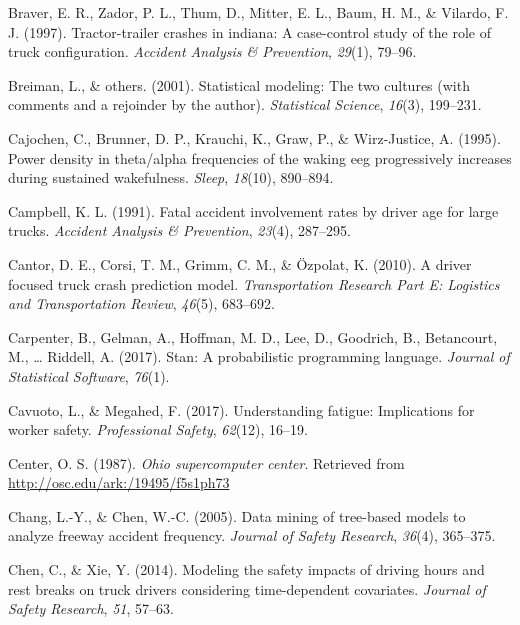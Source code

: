 \documentclass[12pt]{book}
\numberwithin{equation}{chapter}
\begin{document}
\leavevmode\hypertarget{ref-braver1997tractor}{}%
Braver, E. R., Zador, P. L., Thum, D., Mitter, E. L., Baum, H. M., \& Vilardo, F. J. (1997). Tractor-trailer crashes in indiana: A case-control study of the role of truck configuration. \emph{Accident Analysis \& Prevention}, \emph{29}(1), 79--96.

\leavevmode\hypertarget{ref-breiman2001statistical}{}%
Breiman, L., \& others. (2001). Statistical modeling: The two cultures (with comments and a rejoinder by the author). \emph{Statistical Science}, \emph{16}(3), 199--231.

\leavevmode\hypertarget{ref-cajochen1995power}{}%
Cajochen, C., Brunner, D. P., Krauchi, K., Graw, P., \& Wirz-Justice, A. (1995). Power density in theta/alpha frequencies of the waking eeg progressively increases during sustained wakefulness. \emph{Sleep}, \emph{18}(10), 890--894.

\leavevmode\hypertarget{ref-campbell1991fatal}{}%
Campbell, K. L. (1991). Fatal accident involvement rates by driver age for large trucks. \emph{Accident Analysis \& Prevention}, \emph{23}(4), 287--295.

\leavevmode\hypertarget{ref-cantor2010driver}{}%
Cantor, D. E., Corsi, T. M., Grimm, C. M., \& Özpolat, K. (2010). A driver focused truck crash prediction model. \emph{Transportation Research Part E: Logistics and Transportation Review}, \emph{46}(5), 683--692.

\leavevmode\hypertarget{ref-carpenter2017stan}{}%
Carpenter, B., Gelman, A., Hoffman, M. D., Lee, D., Goodrich, B., Betancourt, M., \ldots{} Riddell, A. (2017). Stan: A probabilistic programming language. \emph{Journal of Statistical Software}, \emph{76}(1).

\leavevmode\hypertarget{ref-cavuoto2017understanding}{}%
Cavuoto, L., \& Megahed, F. (2017). Understanding fatigue: Implications for worker safety. \emph{Professional Safety}, \emph{62}(12), 16--19.

\leavevmode\hypertarget{ref-OSC1987}{}%
Center, O. S. (1987). \emph{Ohio supercomputer center}. Retrieved from \url{http://osc.edu/ark:/19495/f5s1ph73}

\leavevmode\hypertarget{ref-chang2005data}{}%
Chang, L.-Y., \& Chen, W.-C. (2005). Data mining of tree-based models to analyze freeway accident frequency. \emph{Journal of Safety Research}, \emph{36}(4), 365--375.

\leavevmode\hypertarget{ref-chen2014modeling}{}%
Chen, C., \& Xie, Y. (2014). Modeling the safety impacts of driving hours and rest breaks on truck drivers considering time-dependent covariates. \emph{Journal of Safety Research}, \emph{51}, 57--63.
\end{document}
